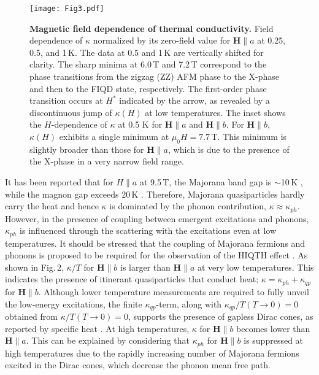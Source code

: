 \documentclass[twocolumn,preprintnumbers,prl,superscriptaddress,amsmath,amssymb,amsfonts]{revtex4}
\begin{document}
\begin{figure}
	\texttt{[image: Fig3.pdf]}
	\caption{\textbf{Magnetic field dependence of thermal conductivity.}
		Field dependence of $\kappa$ normalized by its zero-field value for $\bm{H} \parallel a$ at 0.25, 0.5, and 1\,K. The data at 0.5 and 1\,K are vertically shifted for clarity. The sharp minima at 6.0\,T and 7.2\,T correspond to the phase transitions from the zigzag (ZZ) AFM phase to the  X-phase and then to the FIQD state, respectively. The first-order phase transition occurs at $H^*$ indicated by the arrow, as revealed by a discontinuous jump of $\kappa(H)$ at low temperatures. The inset shows the $H$-dependence of $\kappa$ at 0.5 K for $\bm{H}\parallel a$ and $\bm{H}\parallel b$. For ${\bm H}\parallel b$, $\kappa(H)$ exhibits a single minimum at $\mu_0H=7.7$\,T. This minimum is slightly broader than those for ${\bm H}\parallel a$, which is due to the presence of the X-phase in a very narrow field range.}
\end{figure}

It has been reported that for {\boldmath $H$}$\parallel a$ at 9.5\,T, the Majorana band gap is $\sim$10\,K \cite{tanaka2020thermodynamic}, while the magnon gap exceeds 20\,K \cite{PhysRevB.100.060405}. Therefore, Majorana quasiparticles hardly carry the heat and hence $\kappa$ is dominated by the phonon contribution, $\kappa\approx \kappa_{ph}$. However, in the presence of coupling between emergent excitations and phonons, $\kappa_{ph}$ is influenced through the scattering with the excitations even at low temperatures. It should be stressed that the coupling of Majorana fermions and phonons is proposed to be required for the observation of the HIQTH effect \cite{PhysRevX.8.031032,PhysRevLett.121.147201}. As shown in Fig.\,2, $\kappa/T$ for $\bm{H}\parallel b$ is larger than $\bm{H}\parallel a$ at very low temperatures. This indicates the presence of itinerant quasiparticles that conduct heat; $\kappa=\kappa_{ph}+\kappa_{qp}$ for $\bm{H} \parallel b$. Although lower temperature measurements are required to fully unveil the low-energy excitations, the finite $\kappa_{qp}$-term, along with $\kappa_{qp}/T(T\rightarrow 0)=0$ obtained from $\kappa/T(T\rightarrow 0)=0$, supports the presence of gapless Dirac cones, as reported by specific heat \cite{tanaka2020thermodynamic}.
At high temperatures, $\kappa$ for ${\bm H}\parallel b$ becomes lower than ${\bm H}\parallel a$. This can be explained by considering that $\kappa_{ph}$ for ${\bm H}\parallel b$ is suppressed at high temperatures due to the rapidly increasing number of Majorana fermions excited in the Dirac cones, which decrease the phonon mean free path.
\end{document}
